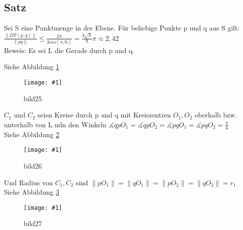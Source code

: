 \documentclass{article}
\newcommand{\bild}[4]{ %
	\begin{figure}[h!]
		\centering
		\texttt{[image: \#1]}
		\caption{#3}
		\label{#4}
	\end{figure}	
}
\newcommand{\sieheBild}[4]{
	Siehe Abbildung \ref{#4}
	\bild{#1}{#2}{#3}{#4}
}
\newcommand{\doubleAbs}[1]{
	\|#1\|
}
\begin{document}
\subsection*{Satz}
Sei S eine Punktmenge in der Ebene.
Für beliebige Punkte p und q aus S gilt:
$\frac{\doubleAbs{DT(p, q)}}{\doubleAbs{pq}} \leq \frac{2 \pi}{3 cos(\pi / 6)} = \frac{4 \sqrt{3}}{9} \pi \approx 2,42$\\
Beweis: Es sei L die Gerade durch p und q.
\sieheBild{Bilder/25.png}{0.4}{bild25}{Bild 25}
$C_1$ und $C_2$ seien Kreise durch p und q mit Kreiszentren $O_1, O_2$ oberhalb bzw. unterhalb von L udn den Winkeln 
$\measuredangle qp O_1 = \measuredangle qp O_2 = \measuredangle pq O_1 = \measuredangle pq O_2 = \frac{\pi}{6}$\\
\sieheBild{Bilder/26.png}{0.4}{bild26}{Bild 26}
Und Radius von $C_1, C_2$ sind $\doubleAbs{p O_1} = \doubleAbs{q O_1} = \doubleAbs{p O_2} = \doubleAbs{q O_2} = r_1$\\
\sieheBild{Bilder/27.png}{0.4}{bild27}{Bild 27}
\end{document}
